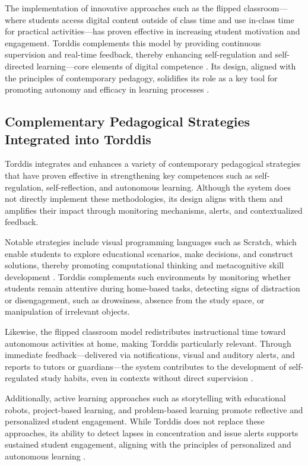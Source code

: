 			The implementation of innovative approaches such as the flipped classroom—where students access digital content outside of class time and use in-class time for practical activities—has proven effective in increasing student motivation and engagement. Torddis complements this model by providing continuous supervision and real-time feedback, thereby enhancing self-regulation and self-directed learning—core elements of digital competence \citep{Echeverria2011AFramework}. Its design, aligned with the principles of contemporary pedagogy, solidifies its role as a key tool for promoting autonomy and efficacy in learning processes \citep{Coffman2024Developing}.
			
		\subsection{Complementary Pedagogical Strategies Integrated into Torddis}
			Torddis integrates and enhances a variety of contemporary pedagogical strategies that have proven effective in strengthening key competences such as self-regulation, self-reflection, and autonomous learning. Although the system does not directly implement these methodologies, its design aligns with them and amplifies their impact through monitoring mechanisms, alerts, and contextualized feedback.
			
			Notable strategies include visual programming languages such as Scratch, which enable students to explore educational scenarios, make decisions, and construct solutions, thereby promoting computational thinking and metacognitive skill development \citep{SaezLopez2016Visual}. Torddis complements such environments by monitoring whether students remain attentive during home-based tasks, detecting signs of distraction or disengagement, such as drowsiness, absence from the study space, or manipulation of irrelevant objects.
			
			Likewise, the flipped classroom model redistributes instructional time toward autonomous activities at home, making Torddis particularly relevant. Through immediate feedback—delivered via notifications, visual and auditory alerts, and reports to tutors or guardians—the system contributes to the development of self-regulated study habits, even in contexts without direct supervision \citep{Mohamed2018Implementing}.
			
			Additionally, active learning approaches such as storytelling with educational robots, project-based learning, and problem-based learning promote reflective and personalized student engagement. While Torddis does not replace these approaches, its ability to detect lapses in concentration and issue alerts supports sustained student engagement, aligning with the principles of personalized and autonomous learning \citep{Palioura2025Storytelling}.
			
